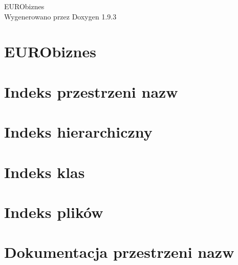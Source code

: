\documentclass[twoside]{book}
\newcommand{\+}{\discretionary{\mbox{\scriptsize$\hookleftarrow$}}{}{}}
\newcommand{\clearemptydoublepage}{%
    \newpage{\pagestyle{empty}\cleardoublepage}%
  }
\begin{document}
  \raggedbottom
    \hypersetup{pageanchor=false,
                bookmarksnumbered=true,
                pdfencoding=unicode
               }
  \begin{titlepage}
  \vspace*{7cm}
  \begin{center}%
  {\Large EURObiznes}\\
  \vspace*{1cm}
  {\large Wygenerowano przez Doxygen 1.9.3}\\
  \end{center}
  \end{titlepage}
  \clearemptydoublepage
  \tableofcontents
  \clearemptydoublepage
  \hypersetup{pageanchor=true}
\chapter{EURObiznes}
\label{index}\hypertarget{index}{}
\chapter{Indeks przestrzeni nazw}

\chapter{Indeks hierarchiczny}

\chapter{Indeks klas}

\chapter{Indeks plików}

\chapter{Dokumentacja przestrzeni nazw}

\end{document}
